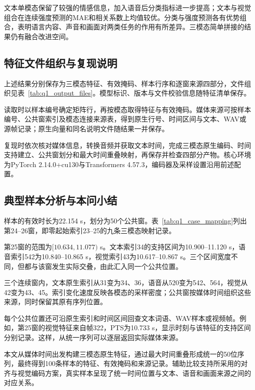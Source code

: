 

\QOneParagraph 文本单模态保留了较强的情感信息，加入语音后分类指标进一步提高；文本与视觉组合在连续强度预测的MAE和相关系数上均值较优。分类与强度预测各有优势组合，表明语言内容、声音和画面对两类任务的作用有所差异。三模态简单拼接的结果仍有融合改进空间。
\subsection{特征文件组织与复现说明}\label{subsec:q1_repro}
\QOneParagraph 上述结果分别保存为三模态特征、有效掩码、样本行序和逐窗来源四部分，文件组织见表~\ref{tab:q1_output_files}。模型标识、版本与文件校验信息随特征清单保存。



\QOneParagraph 读取时以样本编号确定矩阵行，再按模态取得特征与有效掩码。媒体来源可按样本编号、公共窗索引及模态连接来源表，得到原生行号、时间区间与文本、WAV或源帧记录；原生向量和同名说明文件随结果一并保存。

\par{}
\QOneParagraph 复现时依次核对媒体信息，转换音频并获取文本时间，完成三模态原生编码、时间支持建立、公共窗划分和最大时间重叠映射，再保存并检查四部分产物。核心环境为PyTorch 2.14.0+cu130与Transformers 4.57.3，编码器及采样设置沿用前述配置。
\subsection{典型样本分析与本问小结}\label{subsec:q1_case_summary}
\QOneParagraph 样本\texttt{}的有效时长为22.154 s，划分为50个公共窗。表~\ref{tab:q1_case_mapping}列出第24--26窗，即零起始索引23--25的九条三模态映射记录。



\QOneParagraph 第25窗的范围为$[10.634,11.077)$ s。文本索引34的支持区间为10.900--11.120 s，语音索引542为10.840--10.865 s，视觉索引43为10.617--10.867 s。三个区间宽度不同，但都与该窗发生实际交叠，由此汇入同一个公共位置。

\QOneParagraph 三个连续窗内，文本原生索引从31变为34、36，语音从520变为542、564，视觉从42变为43、45。索引变化速度反映各模态的采样密度；公共窗按媒体时间组织这些来源，同时保留其原有序列位置。

\QOneParagraph 每个公共位置还可沿原生索引和时间区间回查文本词语、WAV样本或视频帧。例如，第25窗的视觉特征来自帧322，PTS为10.733 s，显示时刻与该特征的支持区间分别记录。这样，从统一序列可以逐层返回实际媒体来源。

\QOneParagraph 本文从媒体时间出发构建三模态原生特征，通过最大时间重叠形成统一的50位序列，最终得到100条样本的特征、有效掩码和来源记录。辅助比较支持所采用的对齐与视觉编码方案，真实样本呈现了统一时间位置与文本、语音和画面来源之间的对应关系。
